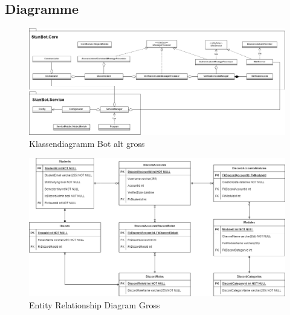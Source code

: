 \documentclass[a4paper, table]{article}
\begin{document}
\subsection{Diagramme}\label{diagrams}
\begin{landscape}
    \begin{figure}[ht]
        \centering
        \hspace*{-5cm}
        \includegraphics[width=1.7\textwidth]{img/Klassendiagramm_Bot_alt.png}
        \caption{Klassendiagramm Bot alt gross}
        \label{fig:Klassendiagramm_Bot_alt_big}
    \end{figure}
\end{landscape}

\begin{landscape}
    \begin{figure}[hb]
        \centering
        \hspace*{-4.5cm}
        \includegraphics[width=1.6\textwidth]{img/ER-Diagramm.png}
        \caption{Entity Relationship Diagram Gross}
        \label{fig:ER-Diagram-big}
    \end{figure}
\end{landscape}
\end{document}
